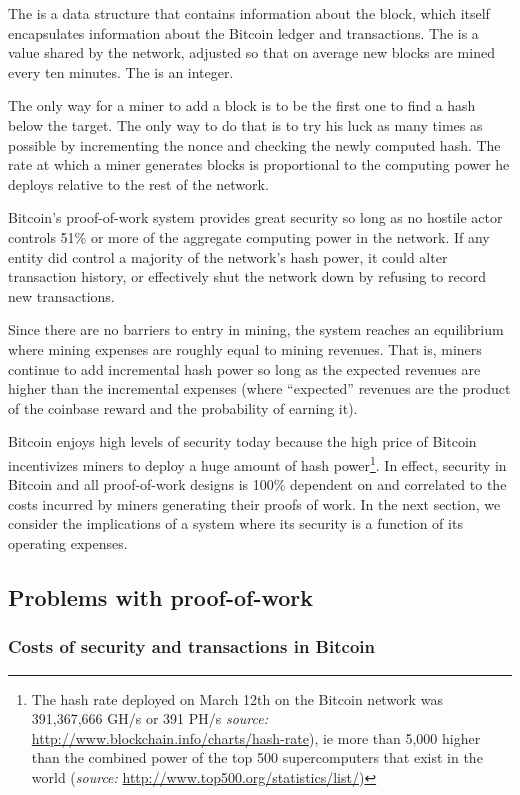 \documentclass[a4paper,11pt]{article}
\begin{document}
The  is a data structure that contains information about the block, which itself encapsulates information about the Bitcoin ledger and transactions. The  is a value shared by the network, adjusted so that on average new blocks are mined every ten minutes. The  is an integer. 

The only way for a miner to add a block is to be the first one to find a hash below the target. The only way to do that is to try his luck as many times as possible by incrementing the nonce and checking the newly computed hash. The rate at which a miner generates blocks is proportional to the computing power he deploys relative to the rest of the network. 

Bitcoin's proof-of-work system provides great security so long as no hostile actor controls 51\% or more of the aggregate computing power in the network. If any entity did control a majority of the network's hash power, it could alter transaction history, or effectively shut the network down by refusing to record new transactions. 

Since there are no barriers to entry in mining, the system reaches an equilibrium where mining expenses are roughly equal to mining revenues. That is, miners continue to add incremental hash power so long as the expected revenues are higher than the incremental expenses (where ``expected'' revenues are the product of the coinbase reward and the probability of earning it).

Bitcoin enjoys high levels of security today because the high price of Bitcoin incentivizes miners to deploy a huge amount of hash power\footnote{The hash rate deployed on March 12th on the Bitcoin network was 391,367,666 GH/s or 391 PH/s \textit{source:} \url{http://www.blockchain.info/charts/hash-rate}), ie more than 5,000 higher than the combined power of the top 500 supercomputers that exist in the world (\textit{source:} \url{http://www.top500.org/statistics/list/})}. In effect, security in Bitcoin and all proof-of-work designs is 100\% dependent on and correlated to the costs incurred by miners generating their proofs of work. 
In the next section, we consider the implications of a system where its security is a function of its operating expenses. 

\subsection{Problems with proof-of-work}
\subsubsection{Costs of security and transactions in Bitcoin}
\end{document}

